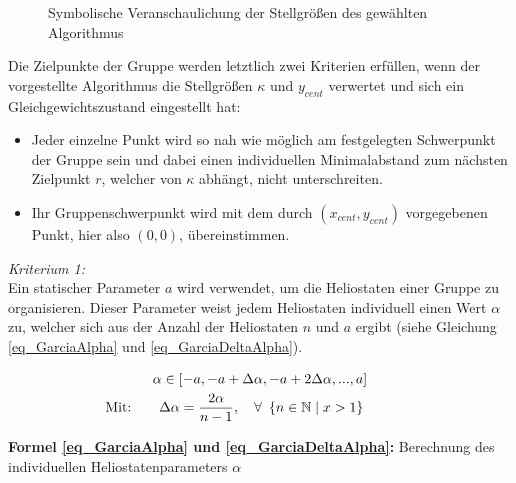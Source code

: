 \begin{figure}[h!]
    \centering
    \setlength{\fboxsep}{1pt}
    \setlength{\fboxrule}{1pt}
\caption[Symbolische Veranschaulichung der Stellgrößen des gewählten Algorithmus]{Symbolische Veranschaulichung der Stellgrößen des gewählten Algorithmus \cite[S.7]{Garcia2}}
    \label{fig_DispersionVeranschaulichung}
\end{figure}


Die Zielpunkte der Gruppe werden letztlich zwei Kriterien erfüllen, wenn der vorgestellte Algorithmus die Stellgrößen $\kappa$ und $y_{cent}$ verwertet und sich ein Gleichgewichtszustand eingestellt hat:
\begin{itemize}
    \item Jeder einzelne Punkt wird so nah wie möglich am festgelegten Schwerpunkt der Gruppe sein und dabei einen individuellen Minimalabstand zum nächsten Zielpunkt $r$, welcher von $\kappa$ abhängt, nicht unterschreiten.
    \item Ihr Gruppenschwerpunkt wird mit dem durch $(x_{cent}, y_{cent})$ vorgegebenen Punkt, hier also $(0,0)$, übereinstimmen.
\end{itemize}

\textit{Kriterium 1:}\\
Ein statischer Parameter $a$ wird verwendet, um die Heliostaten einer Gruppe zu organisieren. Dieser Parameter weist jedem Heliostaten individuell einen Wert $\alpha$ zu, welcher sich aus der Anzahl der Heliostaten $n$ und $a$ ergibt (siehe Gleichung \ref{eq_GarciaAlpha} und \ref{eq_GarciaDeltaAlpha}).

\begin{gather}
    \alpha \in \left[-a, -a+\Delta\alpha, -a+2\Delta\alpha,..., a\right] \label{eq_GarciaAlpha}\\
    \text{\myequations{\quad Berechnung des individuellen Heliostatenparameters $\alpha$}}
    \text{Mit:\qquad}\Delta\alpha = \frac{2\alpha}{n-1}, \quad \forall~\left\{n \in \mathbb{N} \mid x > 1 \right\} \qquad\qquad \label{eq_GarciaDeltaAlpha}
\end{gather}
\centerline{\small{\textsf{\textbf{Formel \ref{eq_GarciaAlpha} und \ref{eq_GarciaDeltaAlpha}:}} Berechnung des individuellen Heliostatenparameters $\alpha$}}

